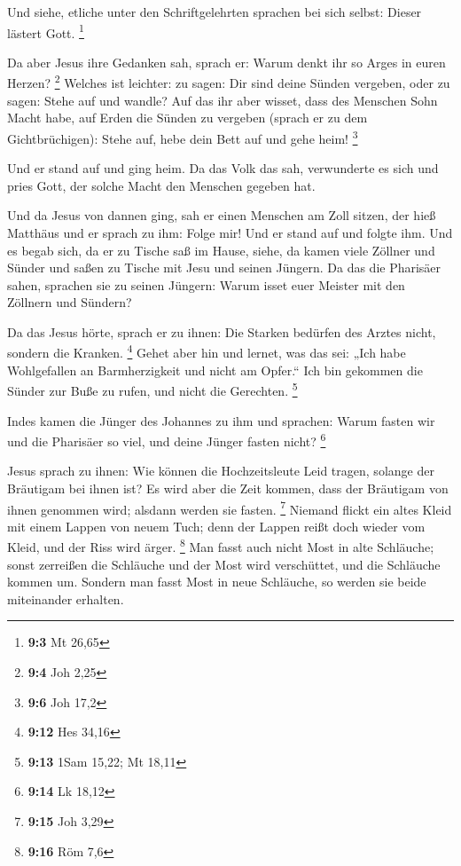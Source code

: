  Und siehe, etliche unter den Schriftgelehrten sprachen bei
sich selbst: Dieser lästert Gott. \footnote{\textbf{9:3} Mt 26,65}

 Da aber Jesus ihre Gedanken sah, sprach er: Warum denkt ihr
so Arges in euren Herzen? \footnote{\textbf{9:4} Joh 2,25} 
Welches ist leichter: zu sagen: Dir sind deine Sünden vergeben, oder zu
sagen: Stehe auf und wandle?  Auf das ihr aber wisset, dass
des Menschen Sohn Macht habe, auf Erden die Sünden zu vergeben (sprach
er zu dem Gichtbrüchigen): Stehe auf, hebe dein Bett auf und gehe heim!
\footnote{\textbf{9:6} Joh 17,2}

 Und er stand auf und ging heim.  Da das Volk
das sah, verwunderte es sich und pries Gott, der solche Macht den
Menschen gegeben hat.

 Und da Jesus von dannen ging, sah er einen Menschen am Zoll
sitzen, der hieß Matthäus und er sprach zu ihm: Folge mir! Und er stand
auf und folgte ihm.  Und es begab sich, da er zu Tische saß
im Hause, siehe, da kamen viele Zöllner und Sünder und saßen zu Tische
mit Jesu und seinen Jüngern.  Da das die Pharisäer sahen,
sprachen sie zu seinen Jüngern: Warum isset euer Meister mit den
Zöllnern und Sündern?

 Da das Jesus hörte, sprach er zu ihnen: Die Starken
bedürfen des Arztes nicht, sondern die Kranken. \footnote{\textbf{9:12}
  Hes 34,16}  Gehet aber hin und lernet, was das sei: „Ich
habe Wohlgefallen an Barmherzigkeit und nicht am Opfer.`` Ich bin
gekommen die Sünder zur Buße zu rufen, und nicht die Gerechten.
\footnote{\textbf{9:13} 1Sam 15,22; Mt 18,11}

 Indes kamen die Jünger des Johannes zu ihm und sprachen:
Warum fasten wir und die Pharisäer so viel, und deine Jünger fasten
nicht? \footnote{\textbf{9:14} Lk 18,12}

 Jesus sprach zu ihnen: Wie können die Hochzeitsleute Leid
tragen, solange der Bräutigam bei ihnen ist? Es wird aber die Zeit
kommen, dass der Bräutigam von ihnen genommen wird; alsdann werden sie
fasten. \footnote{\textbf{9:15} Joh 3,29}  Niemand flickt
ein altes Kleid mit einem Lappen von neuem Tuch; denn der Lappen reißt
doch wieder vom Kleid, und der Riss wird ärger. \footnote{\textbf{9:16}
  Röm 7,6}  Man fasst auch nicht Most in alte Schläuche;
sonst zerreißen die Schläuche und der Most wird verschüttet, und die
Schläuche kommen um. Sondern man fasst Most in neue Schläuche, so werden
sie beide miteinander erhalten.

